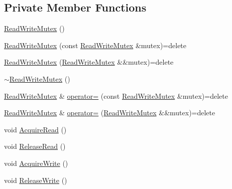 \subsection*{Private Member Functions}
\begin{DoxyCompactItemize}
\item 
\hyperlink{classmage_1_1_read_write_mutex_aae10694de3862f2d1059477169883940}{Read\+Write\+Mutex} ()
\item 
\hyperlink{classmage_1_1_read_write_mutex_aacb2f69e7e2b084147e1e45628e9dd67}{Read\+Write\+Mutex} (const \hyperlink{classmage_1_1_read_write_mutex}{Read\+Write\+Mutex} \&mutex)=delete
\item 
\hyperlink{classmage_1_1_read_write_mutex_a664e946edfa742dad648fc9fcb29832e}{Read\+Write\+Mutex} (\hyperlink{classmage_1_1_read_write_mutex}{Read\+Write\+Mutex} \&\&mutex)=delete
\item 
\hyperlink{classmage_1_1_read_write_mutex_a73676d9414658d63edfe443ee1d55c8b}{$\sim$\+Read\+Write\+Mutex} ()
\item 
\hyperlink{classmage_1_1_read_write_mutex}{Read\+Write\+Mutex} \& \hyperlink{classmage_1_1_read_write_mutex_a408e06f3c8bcc644e43afbf7e9ac772f}{operator=} (const \hyperlink{classmage_1_1_read_write_mutex}{Read\+Write\+Mutex} \&mutex)=delete
\item 
\hyperlink{classmage_1_1_read_write_mutex}{Read\+Write\+Mutex} \& \hyperlink{classmage_1_1_read_write_mutex_a14ea4d1be75046741a7663e0d86a017a}{operator=} (\hyperlink{classmage_1_1_read_write_mutex}{Read\+Write\+Mutex} \&\&mutex)=delete
\item 
void \hyperlink{classmage_1_1_read_write_mutex_af78045647078aaf3966c8f1b06e35c92}{Acquire\+Read} ()
\item 
void \hyperlink{classmage_1_1_read_write_mutex_a0af5059a9bd16abd8a21b15e7ebe053d}{Release\+Read} ()
\item 
void \hyperlink{classmage_1_1_read_write_mutex_a76137013107a9c2c1fc05c1e0747965e}{Acquire\+Write} ()
\item 
void \hyperlink{classmage_1_1_read_write_mutex_ad0fd296bdaa212f54a58372c8dfe1d1d}{Release\+Write} ()
\end{DoxyCompactItemize}
